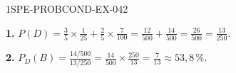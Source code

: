 \begin{corrige}{1SPE-PROBCOND-EX-042}

\textbf{1.} $P(D) = \frac{3}{5}\times\frac{1}{25}+\frac{2}{5}\times\frac{7}{100} = \frac{12}{500}+\frac{14}{500} = \frac{26}{500} = \frac{13}{250}$.

\textbf{2.} $P_D(B) = \frac{14/500}{13/250} = \frac{14}{500}\times\frac{250}{13} = \frac{7}{13} \approx 53{,}8\,\%$.

\end{corrige}
